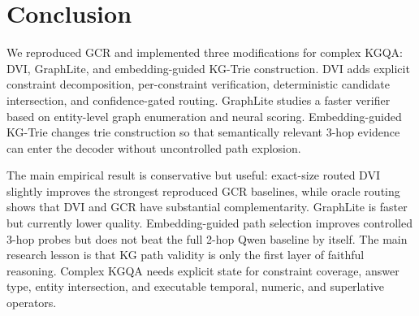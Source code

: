 \documentclass[10pt,twocolumn]{article}
\begin{document}
\section{Conclusion}
We reproduced GCR and implemented three modifications for complex KGQA: DVI, GraphLite, and embedding-guided KG-Trie construction. DVI adds explicit constraint decomposition, per-constraint verification, deterministic candidate intersection, and confidence-gated routing. GraphLite studies a faster verifier based on entity-level graph enumeration and neural scoring. Embedding-guided KG-Trie changes trie construction so that semantically relevant 3-hop evidence can enter the decoder without uncontrolled path explosion.

The main empirical result is conservative but useful: exact-size routed DVI slightly improves the strongest reproduced GCR baselines, while oracle routing shows that DVI and GCR have substantial complementarity. GraphLite is faster but currently lower quality. Embedding-guided path selection improves controlled 3-hop probes but does not beat the full 2-hop Qwen baseline by itself. The main research lesson is that KG path validity is only the first layer of faithful reasoning. Complex KGQA needs explicit state for constraint coverage, answer type, entity intersection, and executable temporal, numeric, and superlative operators.
\end{document}
